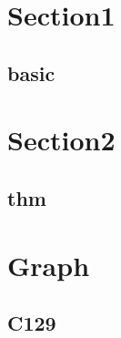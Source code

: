\section{Section1}
    \subsection{basic}
        

\section{Section2}
    \subsection{thm}
        

\section{Graph}
    \subsection{C129}
        
        
